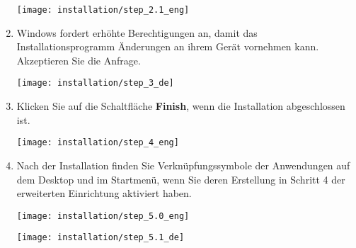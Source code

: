 \begin{enumerate}
	\begin{minipage}{0.6\textwidth}
		\texttt{[image: installation/step\_2.1\_eng]}
	\end{minipage}

	\item Windows fordert erhöhte Berechtigungen an, damit das Installationsprogramm Änderungen an ihrem Gerät vornehmen kann. Akzeptieren Sie die Anfrage.

	\begin{minipage}{0.6\textwidth}
		\texttt{[image: installation/step\_3\_de]}
	\end{minipage}
	\item Klicken Sie auf die Schaltfläche \textbf{Finish}, wenn die Installation abgeschlossen ist.

	\begin{minipage}{0.6\textwidth}
		\texttt{[image: installation/step\_4\_eng]}
	\end{minipage}

	\item Nach der Installation finden Sie Verknüpfungssymbole der Anwendungen auf dem Desktop und im Startmenü, wenn Sie deren Erstellung in Schritt 4 der erweiterten Einrichtung aktiviert haben.

	\begin{minipage}[t][][b]{0.4\textwidth}
		\texttt{[image: installation/step\_5.0\_eng]}
	\end{minipage}
	\begin{minipage}[t][][b]{0.4\textwidth}
		\texttt{[image: installation/step\_5.1\_de]}
	\end{minipage}
 \end{enumerate}



